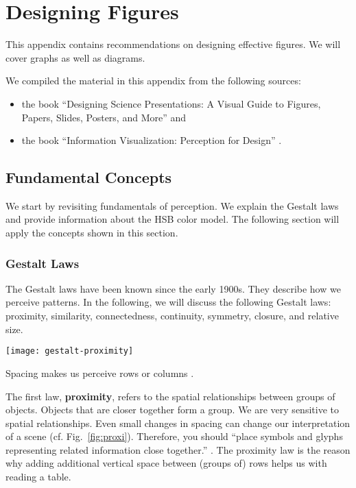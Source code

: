  
\chapter{Designing Figures}

This appendix contains recommendations on designing effective figures. We will cover graphs as well as diagrams.

We compiled the material in this appendix from the following sources:
\begin{itemize}
  \item the book ``Designing Science Presentations: A Visual Guide to Figures, Papers, Slides, Posters, and More'' \cite{Carter12} and
  \item the book ``Information Visualization: Perception for Design'' \cite{Ware12}. %
\end{itemize}

\section{Fundamental Concepts}

We start by revisiting fundamentals of perception. We explain the Gestalt laws and provide information about the HSB color model. The following section will apply the concepts shown in this section. 

\subsection{Gestalt Laws}

The Gestalt laws have been known since the early 1900s. They describe how we perceive patterns. In the following, we will discuss the following Gestalt laws: proximity, similarity, connectedness, continuity, symmetry, closure, and relative size.

\begin{marginfigure}
\centering
\texttt{[image: gestalt-proximity]}
\caption{\label{fig:proxi} Spacing makes us perceive rows or columns \cite{Ware12}.}%
\end{marginfigure}


The first law, \textbf{proximity}, refers to the spatial relationships between groups of objects. Objects that are closer together form a group. We are very sensitive to spatial relationships. Even small changes in spacing can change our interpretation of a scene (cf. Fig.~\ref{fig:proxi}). Therefore, you should ``place symbols and glyphs representing related information close together.'' 
\cite{Ware12}. The proximity law is the reason why adding additional vertical space between (groups of) rows helps us with reading a table.

